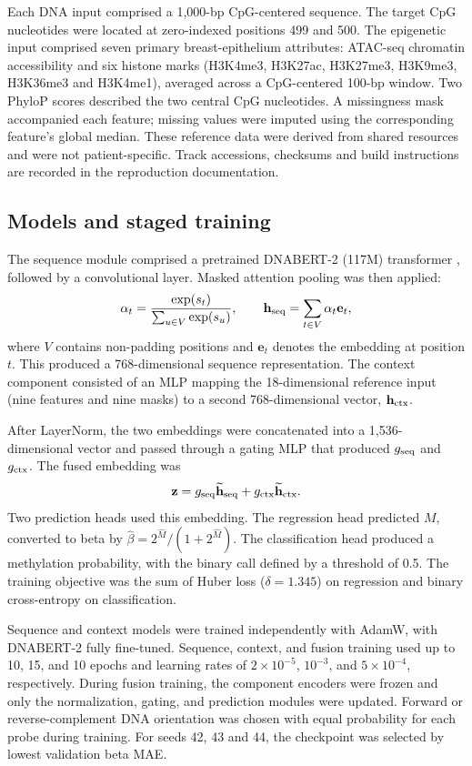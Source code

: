 \documentclass[11pt,letterpaper,twocolumn]{article}
\begin{document}
Each DNA input comprised a 1,000-bp CpG-centered sequence. The target CpG nucleotides were located at zero-indexed positions 499 and 500. The epigenetic input comprised seven primary breast-epithelium attributes: ATAC-seq chromatin accessibility and six histone marks (H3K4me3, H3K27ac, H3K27me3, H3K9me3, H3K36me3 and H3K4me1), averaged across a CpG-centered 100-bp window. Two PhyloP scores described the two central CpG nucleotides. A missingness mask accompanied each feature; missing values were imputed using the corresponding feature's global median. These reference data were derived from shared resources and were not patient-specific. Track accessions, checksums and build instructions are recorded in the reproduction documentation.

\subsection{Models and staged training}
The sequence module comprised a pretrained DNABERT-2 (117M) transformer \cite{zhou2024dnabert2}, followed by a convolutional layer. Masked attention pooling was then applied:
\[
\alpha_t=\frac{\exp(s_t)}{\sum_{u\in V}\exp(s_u)},\qquad
\mathbf h_{\rm seq}=\sum_{t\in V}\alpha_t\mathbf e_t,
\]
where $V$ contains non-padding positions and $\mathbf e_t$ denotes the embedding at position $t$. This produced a 768-dimensional sequence representation. The context component consisted of an MLP mapping the 18-dimensional reference input (nine features and nine masks) to a second 768-dimensional vector, $\mathbf h_{\rm ctx}$.

After LayerNorm, the two embeddings were concatenated into a 1,536-dimensional vector and passed through a gating MLP that produced $g_{\rm seq}$ and $g_{\rm ctx}$. The fused embedding was
\[
\mathbf z=g_{\rm seq}\widetilde{\mathbf h}_{\rm seq}
+g_{\rm ctx}\widetilde{\mathbf h}_{\rm ctx}.
\]
Two prediction heads used this embedding. The regression head predicted $M$, converted to beta by $\widehat\beta=2^{\widehat M}/(1+2^{\widehat M})$. The classification head produced a methylation probability, with the binary call defined by a threshold of 0.5. The training objective was the sum of Huber loss ($\delta=1.345$) on regression and binary cross-entropy on classification.

Sequence and context models were trained independently with AdamW, with DNABERT-2 fully fine-tuned. Sequence, context, and fusion training used up to 10, 15, and 10 epochs and learning rates of $2\times10^{-5}$, $10^{-3}$, and $5\times10^{-4}$, respectively. During fusion training, the component encoders were frozen and only the normalization, gating, and prediction modules were updated. Forward or reverse-complement DNA orientation was chosen with equal probability for each probe during training. For seeds 42, 43 and 44, the checkpoint was selected by lowest validation beta MAE.
\end{document}
